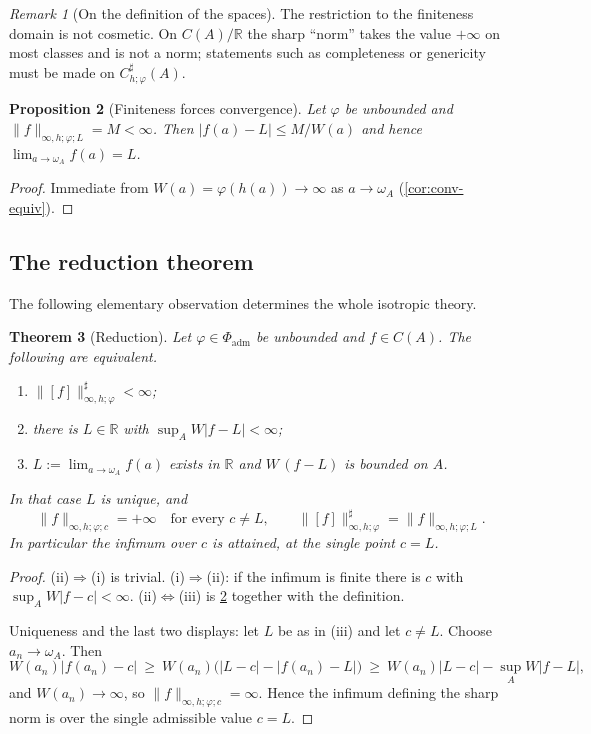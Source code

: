 \documentclass[11pt,a4paper]{article}
\numberwithin{equation}{section}
\theoremstyle{plain}
\newtheorem{theorem}{Theorem}[section]
\newtheorem{proposition}[theorem]{Proposition}
\theoremstyle{definition}
\theoremstyle{remark}
\newtheorem{remark}[theorem]{Remark}
\newcommand{\R}{\mathbb{R}}
\newcommand{\wA}{\omega_A}
\begin{document}
\begin{remark}[On the definition of the spaces]\label{rem:space-def}
The restriction to the finiteness domain is not cosmetic. On $C(A)/\R$ the sharp
``norm'' takes the value $+\infty$ on most classes and is not a norm; statements such as
completeness or genericity must be made on $C^{\sharp}_{h;\varphi}(A)$.
\end{remark}

\begin{proposition}[Finiteness forces convergence]\label{prop:finite-implies-conv}
Let $\varphi$ be unbounded and $\|f\|_{\infty,h;\varphi;L}=M<\infty$. Then
$|f(a)-L|\le M/W(a)$ and hence $\lim_{a\to\wA}f(a)=L$.
\end{proposition}

\begin{proof}
Immediate from $W(a)=\varphi(h(a))\to\infty$ as $a\to\wA$ (\cref{cor:conv-equiv}).
\end{proof}

\subsection{The reduction theorem}

The following elementary observation determines the whole isotropic theory.

\begin{theorem}[Reduction]\label{thm:reduction}
Let $\varphi\in\Phi_{\mathrm{adm}}$ be unbounded and $f\in C(A)$. The following are
equivalent.
\begin{enumerate}
\item[(i)] $\|[f]\|^{\sharp}_{\infty,h;\varphi}<\infty$;
\item[(ii)] there is $L\in\R$ with $\sup_A W|f-L|<\infty$;
\item[(iii)] $L:=\lim_{a\to\wA}f(a)$ exists in $\R$ and $W\,(f-L)$ is bounded on $A$.
\end{enumerate}
In that case $L$ is unique, and
\[
\|f\|_{\infty,h;\varphi;c}=+\infty\quad\text{for every }c\ne L,
\qquad
\|[f]\|^{\sharp}_{\infty,h;\varphi}=\|f\|_{\infty,h;\varphi;L}.
\]
In particular the infimum over $c$ is attained, at the single point $c=L$.
\end{theorem}

\begin{proof}
(ii)$\Rightarrow$(i) is trivial. (i)$\Rightarrow$(ii): if the infimum is finite there is
$c$ with $\sup_AW|f-c|<\infty$. (ii)$\Leftrightarrow$(iii) is
\cref{prop:finite-implies-conv} together with the definition.

Uniqueness and the last two displays: let $L$ be as in (iii) and let $c\ne L$. Choose
$a_n\to\wA$. Then
\[
W(a_n)|f(a_n)-c|\ \ge\ W(a_n)\bigl(|L-c|-|f(a_n)-L|\bigr)\ \ge\ W(a_n)|L-c|-\sup_AW|f-L|,
\]
and $W(a_n)\to\infty$, so $\|f\|_{\infty,h;\varphi;c}=\infty$. Hence the infimum defining
the sharp norm is over the single admissible value $c=L$.
\end{proof}
\end{document}
